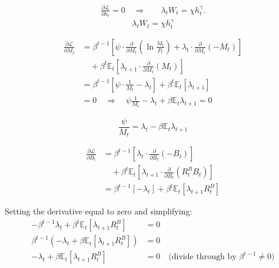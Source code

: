 \documentclass[11pt,preprint]{elsarticle}
\numberwithin{equation}{section}
\numberwithin{figure}{section}
\numberwithin{table}{section}
\begin{document}
\begin{align*}
  \frac{\partial \mathcal{L}}{\partial h_t} = 0
  \quad\Rightarrow\quad
  &\lambda_t W_t = \chi h_t^{\gamma}.
\end{align*} \begin{equation}\label{foc_h}
  \boxed{\lambda_t W_t = \chi h_t^{\gamma}}
\end{equation}

\begin{align*}
\frac{\partial \mathcal{L}}{\partial M_t} 
&= \beta^{t-1} \left[ 
   \psi \cdot \frac{\partial}{\partial M_t} \left( \ln \frac{M_t}{P_t} \right) 
   + \lambda_t \cdot \frac{\partial}{\partial M_t} (-M_t) 
\right] \\
&\quad + \beta^{t} \mathbb{E}_t \left[ 
   \lambda_{t+1} \cdot \frac{\partial}{\partial M_t} (M_t)
\right] \\
&= \beta^{t-1} \left[ 
   \psi \cdot \frac{1}{M_t} 
   - \lambda_t 
\right] 
+ \beta^{t} \mathbb{E}_t \left[ \lambda_{t+1} \right] \\
&= 0 \quad\Rightarrow\quad
\psi \frac{1}{M_t} - \lambda_t + \beta \mathbb{E}_t \lambda_{t+1} = 0
\end{align*}

\begin{equation}\label{foc_M}
\boxed{\frac{\psi}{M_t} = \lambda_t - \beta \mathbb{E}_t \lambda_{t+1}}
\end{equation}

\begin{align*}
\frac{\partial \mathcal{L}}{\partial B_t} 
&= \beta^{t-1} \left[ 
   \lambda_t \cdot \frac{\partial}{\partial B_t} (-B_t) %
\right] \\
&\quad + \beta^{t} \mathbb{E}_t \left[ 
   \lambda_{t+1} \cdot \frac{\partial}{\partial B_t} (R^B_t B_t) %
\right] \\
&= \beta^{t-1} \left[ -\lambda_t \right] %
+ \beta^{t} \mathbb{E}_t \left[ \lambda_{t+1} R^B_t \right] %
\end{align*}

Setting the derivative equal to zero and simplifying: \begin{align*}
-\beta^{t-1}\lambda_t + \beta^{t}\mathbb{E}_t\left[\lambda_{t+1}R^B_t\right] &= 0 \\
\beta^{t-1}\left(-\lambda_t + \beta\mathbb{E}_t\left[\lambda_{t+1}R^B_t\right]\right) &= 0 \\
-\lambda_t + \beta\mathbb{E}_t\left[\lambda_{t+1}R^B_t\right] &= 0 \quad \text{(divide through by } \beta^{t-1} \neq 0\text{)}
\end{align*}
\end{document}
